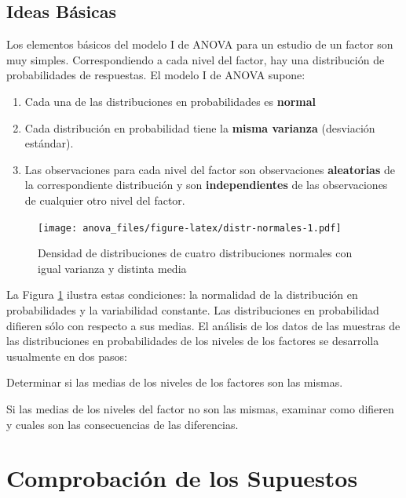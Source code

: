 \documentclass[]{book}
\theoremstyle{definition}
\theoremstyle{definition}
\theoremstyle{definition}
\theoremstyle{remark}
\begin{document}
\hypertarget{ideas-basicas}{%
\subsection{Ideas Básicas}\label{ideas-basicas}}

Los elementos básicos del modelo I de ANOVA para un estudio de un factor
son muy simples. Correspondiendo a cada nivel del factor, hay una
distribución de probabilidades de respuestas. El modelo I de ANOVA
supone:

\begin{enumerate}
\def\labelenumi{\arabic{enumi}.}
\item
  Cada una de las distribuciones en probabilidades es \textbf{normal}
\item
  Cada distribución en probabilidad tiene la \textbf{misma varianza}
  (desviación estándar).
\item
  Las observaciones para cada nivel del factor son observaciones
  \textbf{aleatorias} de la correspondiente distribución y son
  \textbf{independientes} de las observaciones de cualquier otro nivel
  del factor.
\end{enumerate}

\begin{figure}
\centering
\texttt{[image: anova\_files/figure-latex/distr-normales-1.pdf]}
\caption{\label{fig:distr-normales}Densidad de distribuciones de cuatro
distribuciones normales con igual varianza y distinta media}
\end{figure}

La Figura \ref{fig:distr-normales} ilustra estas condiciones: la
normalidad de la distribución en probabilidades y la variabilidad
constante. Las distribuciones en probabilidad difieren sólo con respecto
a sus medias. El análisis de los datos de las muestras de las
distribuciones en probabilidades de los niveles de los factores se
desarrolla usualmente en dos pasos:

Determinar si las medias de los niveles de los factores son las mismas.

Si las medias de los niveles del factor no son las mismas, examinar como
difieren y cuales son las consecuencias de las diferencias.

\hypertarget{comprobacion-de-los-supuestos}{%
\section{Comprobación de los
Supuestos}\label{comprobacion-de-los-supuestos}}
\end{document}
